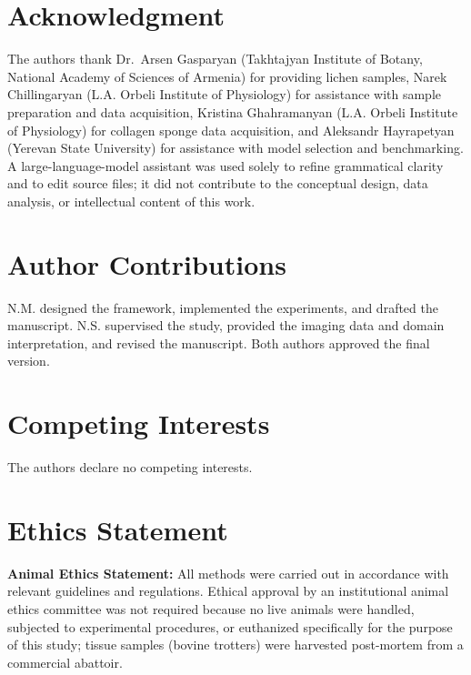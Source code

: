 \documentclass[journal]{IEEEtran}
\begin{document}
\section*{Acknowledgment}
The authors thank Dr.~Arsen Gasparyan (Takhtajyan Institute of Botany, National Academy of Sciences of Armenia) for providing lichen samples, Narek Chillingaryan (L.A. Orbeli Institute of Physiology) for assistance with sample preparation and data acquisition, Kristina Ghahramanyan (L.A. Orbeli Institute of Physiology) for collagen sponge data acquisition, and Aleksandr Hayrapetyan (Yerevan State University) for assistance with model selection and benchmarking. A large-language-model assistant was used solely to refine grammatical clarity and to edit source files; it did not contribute to the conceptual design, data analysis, or intellectual content of this work.

\section*{Author Contributions}
N.M. designed the framework, implemented the experiments, and drafted the manuscript. N.S. supervised the study, provided the imaging data and domain interpretation, and revised the manuscript. Both authors approved the final version.

\section*{Competing Interests}
The authors declare no competing interests.

\section*{Ethics Statement}
\textbf{Animal Ethics Statement:}  All methods were carried out in accordance with relevant guidelines and regulations. Ethical approval by an institutional animal ethics committee was not required because no live animals were handled, subjected to experimental procedures, or euthanized specifically for the purpose of this study; tissue samples (bovine trotters) were harvested post-mortem from a commercial abattoir.


\end{document}
